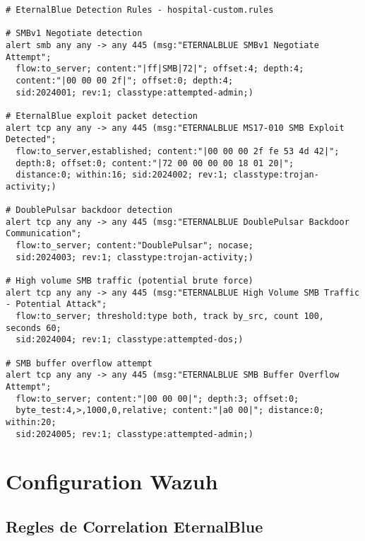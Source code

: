 \begin{lstlisting}[caption=Regles Suricata pour detection EternalBlue]
# EternalBlue Detection Rules - hospital-custom.rules

# SMBv1 Negotiate detection
alert smb any any -> any 445 (msg:"ETERNALBLUE SMBv1 Negotiate Attempt"; 
  flow:to_server; content:"|ff|SMB|72|"; offset:4; depth:4;
  content:"|00 00 00 2f|"; offset:0; depth:4;
  sid:2024001; rev:1; classtype:attempted-admin;)

# EternalBlue exploit packet detection
alert tcp any any -> any 445 (msg:"ETERNALBLUE MS17-010 SMB Exploit Detected"; 
  flow:to_server,established; content:"|00 00 00 2f fe 53 4d 42|"; 
  depth:8; offset:0; content:"|72 00 00 00 00 18 01 20|"; 
  distance:0; within:16; sid:2024002; rev:1; classtype:trojan-activity;)

# DoublePulsar backdoor detection
alert tcp any any -> any 445 (msg:"ETERNALBLUE DoublePulsar Backdoor Communication"; 
  flow:to_server; content:"DoublePulsar"; nocase; 
  sid:2024003; rev:1; classtype:trojan-activity;)

# High volume SMB traffic (potential brute force)
alert tcp any any -> any 445 (msg:"ETERNALBLUE High Volume SMB Traffic - Potential Attack";
  flow:to_server; threshold:type both, track by_src, count 100, seconds 60;
  sid:2024004; rev:1; classtype:attempted-dos;)

# SMB buffer overflow attempt
alert tcp any any -> any 445 (msg:"ETERNALBLUE SMB Buffer Overflow Attempt";
  flow:to_server; content:"|00 00 00|"; depth:3; offset:0;
  byte_test:4,>,1000,0,relative; content:"|a0 00|"; distance:0; within:20;
  sid:2024005; rev:1; classtype:attempted-admin;)
\end{lstlisting}

\section{Configuration Wazuh}

\subsection{Regles de Correlation EternalBlue}

